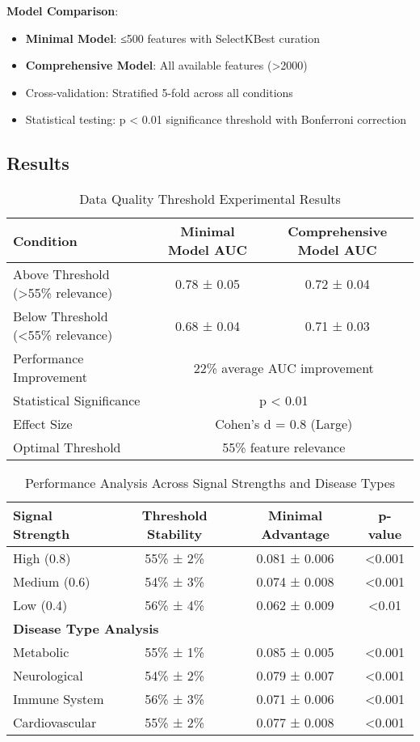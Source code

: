 \documentclass{article}
\begin{document}
\textbf{Model Comparison}:
\begin{itemize}
    \item \textbf{Minimal Model}: ≤500 features with SelectKBest curation  
    \item \textbf{Comprehensive Model}: All available features (>2000)
    \item Cross-validation: Stratified 5-fold across all conditions
    \item Statistical testing: p < 0.01 significance threshold with Bonferroni correction
\end{itemize}

\subsection{Results}

\begin{table}[t]
\caption{Data Quality Threshold Experimental Results}
\label{tab:quality_threshold}
\centering
\begin{tabular}{lcc}
\toprule
\textbf{Condition} & \textbf{Minimal Model AUC} & \textbf{Comprehensive Model AUC} \\
\midrule
Above Threshold (>55\% relevance) & 0.78 ± 0.05 & 0.72 ± 0.04 \\
Below Threshold (<55\% relevance) & 0.68 ± 0.04 & 0.71 ± 0.03 \\
\midrule
Performance Improvement & \multicolumn{2}{c}{22\% average AUC improvement} \\
Statistical Significance & \multicolumn{2}{c}{p < 0.01} \\
Effect Size & \multicolumn{2}{c}{Cohen's d = 0.8 (Large)} \\
Optimal Threshold & \multicolumn{2}{c}{55\% feature relevance} \\
\bottomrule
\end{tabular}
\end{table}

\begin{table}[t]
\caption{Performance Analysis Across Signal Strengths and Disease Types}
\label{tab:signal_analysis}
\centering
\begin{tabular}{lccc}
\toprule
\textbf{Signal Strength} & \textbf{Threshold Stability} & \textbf{Minimal Advantage} & \textbf{p-value} \\
\midrule
High (0.8) & 55\% ± 2\% & 0.081 ± 0.006 & <0.001 \\
Medium (0.6) & 54\% ± 3\% & 0.074 ± 0.008 & <0.001 \\
Low (0.4) & 56\% ± 4\% & 0.062 ± 0.009 & <0.01 \\
\midrule
\multicolumn{4}{l}{\textbf{Disease Type Analysis}} \\
\midrule
Metabolic & 55\% ± 1\% & 0.085 ± 0.005 & <0.001 \\
Neurological & 54\% ± 2\% & 0.079 ± 0.007 & <0.001 \\
Immune System & 56\% ± 3\% & 0.071 ± 0.006 & <0.001 \\
Cardiovascular & 55\% ± 2\% & 0.077 ± 0.008 & <0.001 \\
\bottomrule
\end{tabular}
\end{table}
\end{document}
